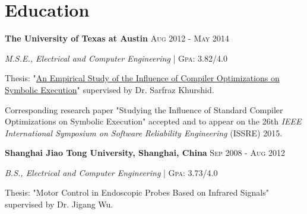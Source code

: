 \documentclass[a4paper,11pt]{article}
\begin{document}
\section{Education}
\textbf{The University of Texas at Austin} \hfill\textsc{Aug 2012 - May 2014}\vspace{-10pt}\\
\begin{itemize}[noitemsep,topsep=0pt,parsep=0pt,partopsep=0pt,leftmargin=*]\vspace{-5pt}
\small{
  \item \emph{M.S.E., Electrical and Computer Engineering} | \textsc{Gpa}: 3.82/4.0
  \item Thesis: "\href{http://repositories.lib.utexas.edu/bitstream/handle/2152/26000/DONG-THESIS-2014.pdf?sequence=1}{An Empirical Study of the Influence of Compiler Optimizations on Symbolic Execution}" supervised by Dr. Sarfraz Khurshid.
  \item Corresponding research paper "Studying the Influence of Standard Compiler Optimizations on Symbolic Execution" accepted and to appear on the 26th \emph{IEEE International Symposium on Software Reliability Engineering} (ISSRE) 2015.
}
\end{itemize}

\textbf{Shanghai Jiao Tong University, Shanghai, China} \hfill\textsc{Sep 2008 - Aug 2012}\vspace{-10pt}\\
\begin{itemize}[noitemsep,topsep=0pt,parsep=0pt,partopsep=0pt,leftmargin=*]\vspace{-5pt}
\small{
  \item \emph{B.S., Electrical and Computer Engineering} | \textsc{Gpa}: 3.73/4.0
  \item Thesis: "Motor Control in Endoscopic Probes Based on Infrared Signals" supervised by Dr. Jigang Wu.
}
\end{itemize}
\end{document}

